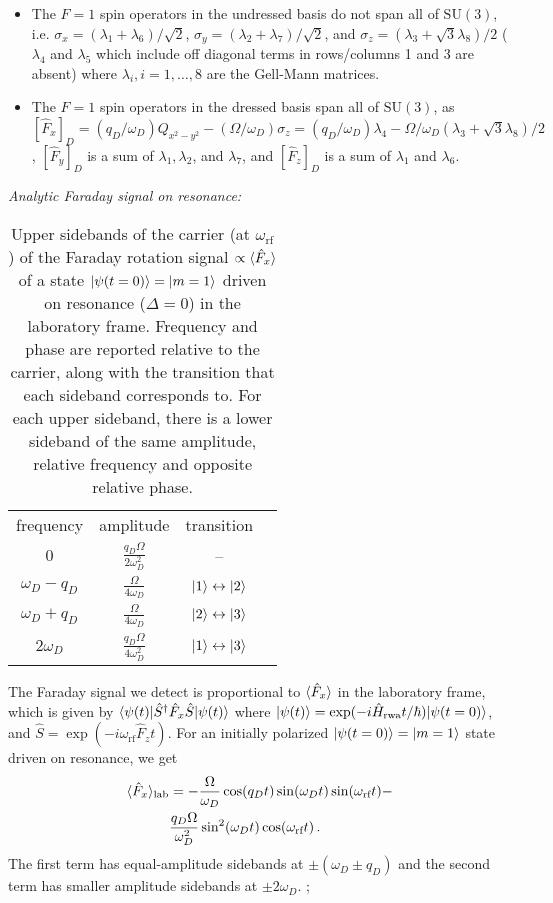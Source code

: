 \documentclass[aps,prl,reprint,superscriptaddress,floatfix]{revtex4-1}
\begin{document}
\begin{itemize}
    \item The $F=1$ spin operators in the undressed basis do not span all of $\text{SU}(3)$, i.e. $\sigma_x = (\lambda_1 + \lambda_6)/\sqrt{2}$, $\sigma_y = (\lambda_2 + \lambda_7)/\sqrt{2}$, and $\sigma_z = (\lambda_3 + \sqrt{3} \lambda_8)/2$ ($\lambda_4$ and $\lambda_5$ which include off diagonal terms in rows/columns 1 and 3 are absent) where $\lambda_i, i = 1,\dots,8$ are the Gell-Mann matrices.
    \item The $F=1$ spin operators in the dressed basis span  all of $\text{SU}(3)$, as $[\hat{F}_x]_D = (q_D/\omega_D) Q_{x^2-y^2} - (\Omega / \omega_D) \sigma_z = (q_D/\omega_D) \lambda_4 - \Omega / \omega_D ( \lambda_3 +\sqrt{3} \lambda_8) / 2$, $[\hat{F}_y]_D$ is a sum of $\lambda_1, \lambda_2$, and $\lambda_7$, and  $[\hat{F}_z]_D$ is a sum of $\lambda_1$ and $\lambda_6$. 
\end{itemize}
\textit{Analytic Faraday signal on resonance:}
\begin{table}[]
\centering
\caption{Upper sidebands of the carrier (at $\omega_{\text{rf}}$) of the Faraday rotation signal $\propto \langle \hat{F}_x \rangle$ of a state $\vert \psi(t=0) \rangle =\vert m=1 \rangle $ driven on resonance ($\Delta = 0$) in the laboratory frame. Frequency and phase are reported relative to the carrier, along with the transition that each sideband corresponds to. For each upper sideband, there is a lower sideband of the same amplitude, relative frequency and opposite \note{$\pi$} relative phase.}
\label{tab:sidebands}
\begin{tabular}{cccc}
frequency & amplitude & transition \\ \hhline{====}
 $0$ & $\frac{q_D \Omega }{2 \omega_D^2}$ & -- \\
 $\omega_D-q_D$ & $\frac{\Omega}{4 \omega_D}$ & $\vert 1 \rangle  \leftrightarrow \vert 2 \rangle $ \\
 $\omega_D+q_D$ & $\frac{\Omega}{4 \omega_D}$ & $\vert 2 \rangle  \leftrightarrow \vert 3 \rangle $\\
 $2 \omega_D$ & $\frac{q_D \Omega}{4 \omega_D^2}$ & $\vert 1 \rangle  \leftrightarrow \vert 3 \rangle $
\end{tabular}
\end{table}
The Faraday signal we detect is proportional to $\langle \hat{F}_x \rangle$ in the laboratory frame, which is given by $\langle \psi(t) \vert \hat{S}^{\dagger} \hat{F}_x \hat{S} \vert \psi(t) \rangle $ where $\vert \psi(t) \rangle  = \exp(-i \hat{H}_{\text{rwa}} t/\hbar) \vert \psi(t=0) \rangle $, and $\hat{S} = \exp(-i \omega_{\text{rf}} \hat{F}_z t)$.
For an initially polarized $\vert \psi(t=0) \rangle  = \vert m=1 \rangle $ state driven on resonance, we get
    \begin{align*}
        \langle \hat{F}_x \rangle_{\text{lab}} &= -\frac{\Omega}{\omega_D} \cos(q_D t) \sin(\omega_D t) \sin(\omega_{\text{rf}} t) - \\ &\frac{q_D \Omega}{\omega_D^2} \sin^2(\omega_D t) \cos(\omega_{\text{rf}} t) \, .
    \end{align*}
The first term has equal-amplitude sidebands at $\pm(\omega_D \pm q_D)$ and the second term has smaller amplitude sidebands at $\pm 2\omega_D$.
;
\end{document}
